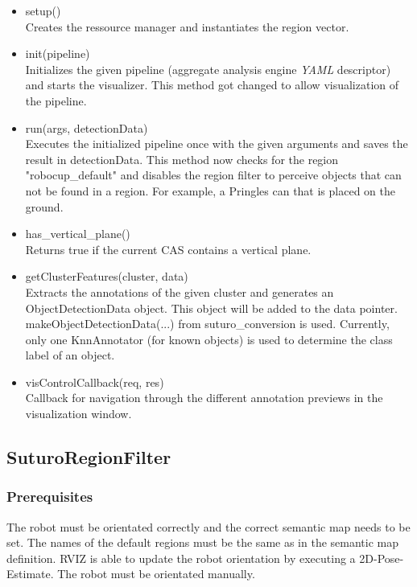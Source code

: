 \documentclass[main.tex]{subfiles}
\begin{document}
\begin{itemize}
\item setup()\\
Creates the ressource manager and instantiates the region vector.

\item init(pipeline)\\
Initializes the given pipeline (aggregate analysis engine \textit{YAML} descriptor) and starts the visualizer.
This method got changed to allow visualization of the pipeline.

\item run(args, detectionData)\\
Executes the initialized pipeline once with the given arguments and saves the result in detectionData.
This method now checks for the region "robocup\_default" and disables the region filter to perceive objects that can not be found
in a region. For example, a Pringles can that is placed on the ground.

\item has\_vertical\_plane()\\
Returns true if the current CAS contains a vertical plane.

\item getClusterFeatures(cluster, data)\\
Extracts the annotations of the given cluster and generates an ObjectDetectionData object. 
This object will be added to the data pointer. makeObjectDetectionData(...) from suturo\_conversion is used.
Currently, only one KnnAnnotator (for known objects) is used to determine the class label of an object.

\item visControlCallback(req, res)\\
Callback for navigation through the different annotation previews in the visualization window.
\end{itemize}

\subsection{SuturoRegionFilter}
\subsubsection{Prerequisites}
The robot must be orientated correctly and the correct semantic map needs to be set.
The names of the default regions must be the same as in the semantic map definition.
RVIZ is able to update the robot orientation by executing a 2D-Pose-Estimate. The robot must be orientated manually.
\end{document}
